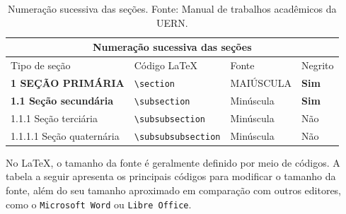 \documentclass[
article,			%
12pt,				%
oneside,			%
a4paper,			%
english,			%
brazil,				%
sumario=tradicional
]{abntex2}
\begin{document}
    \begin{table}[ht!]
    \begin{tabular}{ |p{5cm}||p{4cm}||p{3cm}||p{3cm}|  }
 \hline
 \multicolumn{4}{|c|}{Numeração sucessiva das seções} \\
 \hline
 Tipo de seção & Código \LaTeX & Fonte & Negrito\\
 \hline
 \textbf{1 SEÇÃO PRIMÁRIA}   & \verb|\section| & MAIÚSCULA &   \textbf{Sim} \\
 \textbf{1.1 Seção secundária} &  \verb|\subsection| & Minúscula   & \textbf{Sim} \\
 1.1.1 Seção terciária & \verb|\subsubsection| & Minúscula &  Não \\
 1.1.1.1 Seção quaternária & \verb|\subsubsubsection| & Minúscula &  Não\\
 \hline
\end{tabular}
\caption{Numeração sucessiva das seções. Fonte: Manual de trabalhos acadêmicos da UERN.}
\label{Tabela 1}
\end{table}


    No \LaTeX, o tamanho da fonte é geralmente definido por meio de códigos. A tabela a seguir apresenta os principais códigos para modificar o tamanho da fonte, além do seu tamanho aproximado em comparação com outros editores, como o \texttt{Microsoft Word} ou \texttt{Libre Office}.
\end{document}
